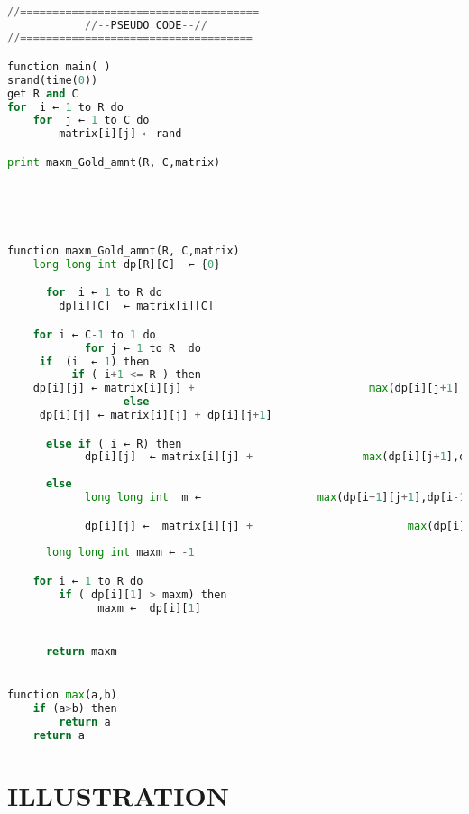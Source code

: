 \documentclass[conference]{IEEEtran}
\begin{document}
\begin{lstlisting}[caption=Algorithm 2, style=chstyle, language=python]

//=====================================
            //--PSEUDO CODE--//
//====================================

function main( )
srand(time(0))
get R and C
for  i ← 1 to R do
	for  j ← 1 to C do
		matrix[i][j] ← rand

print maxm_Gold_amnt(R, C,matrix)





function maxm_Gold_amnt(R, C,matrix)
	long long int dp[R][C]  ← {0}

      for  i ← 1 to R do
		dp[i][C]  ← matrix[i][C]

	for i ← C-1 to 1 do
            for j ← 1 to R  do 
     if  (i  ← 1) then
          if ( i+1 <= R ) then
	dp[i][j] ← matrix[i][j] +   			            max(dp[i][j+1],dp[i+1][j+1])
		          else
 	 dp[i][j] ← matrix[i][j] + dp[i][j+1]

      else if ( i ← R) then
            dp[i][j]  ← matrix[i][j] + 			       max(dp[i][j+1],dp[i-1][j+1])
        
      else
            long long int  m ← 			        max(dp[i+1][j+1],dp[i-1][j+1])

            dp[i][j] ←  matrix[i][j] + 				          max(dp[i][j+1],m);
     
      long long int maxm ← -1

	for i ← 1 to R do
		if ( dp[i][1] > maxm) then
		      maxm ←  dp[i][1]


      return maxm


function max(a,b)
	if (a>b) then
		return a
	return a


\end{lstlisting}


\section{ILLUSTRATION}
\end{document}
